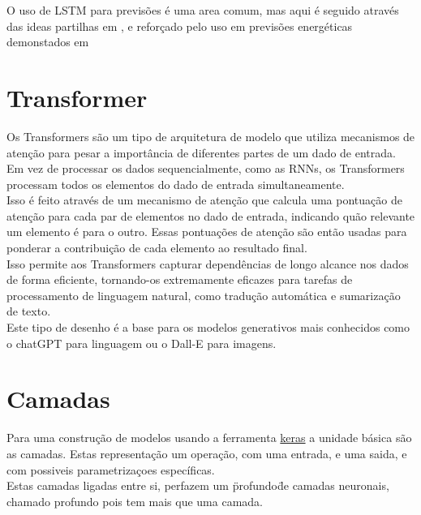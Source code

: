 
O uso de LSTM para previsões é uma area comum, mas aqui é seguido através das ideas partilhas em \cite{Hewamalage2021}, e reforçado pelo uso em previsões energéticas demonstados em \cite{Costa2022} \\


\section{Transformer\label{se:transformer_sec}}

Os Transformers são um tipo de arquitetura de modelo que utiliza mecanismos de atenção para pesar a importância de diferentes partes de um dado de entrada. Em vez de processar os dados sequencialmente, como as RNNs, os Transformers processam todos os elementos do dado de entrada simultaneamente. \\
Isso é feito através de um mecanismo de atenção que calcula uma pontuação de atenção para cada par de elementos no dado de entrada, indicando quão relevante um elemento é para o outro. Essas pontuações de atenção são então usadas para ponderar a contribuição de cada elemento ao resultado final. \\
Isso permite aos Transformers capturar dependências de longo alcance nos dados de forma eficiente, tornando-os extremamente eficazes para tarefas de processamento de linguagem natural, como tradução automática e sumarização de texto.\\

Este tipo de desenho é a base para os modelos generativos mais conhecidos como o chatGPT para linguagem ou o Dall-E para imagens.















\section{Camadas\label{se:layers}}

Para uma construção de modelos usando a ferramenta \href{https://keras.io/}{keras} a unidade básica são as camadas. Estas representação um operação, com uma entrada, e uma saida, e com possiveis parametrizaçoes específicas. \\
Estas camadas ligadas entre si, perfazem um \"profundo\" de camadas neuronais, chamado profundo pois tem mais  que uma camada. \\

